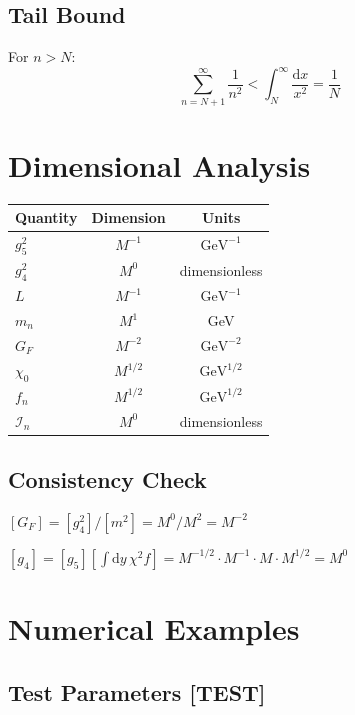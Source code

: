 \documentclass[11pt,a4paper]{article}
\newcommand{\dd}{\mathrm{d}}
\begin{document}
\subsection{Tail Bound}

For $n > N$:
\begin{equation}
\sum_{n=N+1}^{\infty} \frac{1}{n^2} < \int_N^{\infty} \frac{\dd x}{x^2} = \frac{1}{N}
\label{eq:tail-bound}
\end{equation}

\section{Dimensional Analysis}
\label{app:dimensions}

\begin{center}
\begin{tabular}{lcc}
\toprule
Quantity & Dimension & Units \\
\midrule
$g_5^2$ & $M^{-1}$ & $\text{GeV}^{-1}$ \\
$g_4^2$ & $M^0$ & dimensionless \\
$L$ & $M^{-1}$ & $\text{GeV}^{-1}$ \\
$m_n$ & $M^1$ & GeV \\
$G_F$ & $M^{-2}$ & $\text{GeV}^{-2}$ \\
$\chi_0$ & $M^{1/2}$ & $\text{GeV}^{1/2}$ \\
$f_n$ & $M^{1/2}$ & $\text{GeV}^{1/2}$ \\
$\mathcal{I}_n$ & $M^0$ & dimensionless \\
\bottomrule
\end{tabular}
\end{center}

\subsection{Consistency Check}

$[G_F] = [g_4^2]/[m^2] = M^0/M^2 = M^{-2}$ \checkmark

$[g_4] = [g_5][\int \dd y\, \chi^2 f] = M^{-1/2} \cdot M^{-1} \cdot M \cdot M^{1/2} = M^0$ \checkmark

\section{Numerical Examples}
\label{app:numerics}

\subsection{Test Parameters [TEST]}
\end{document}

